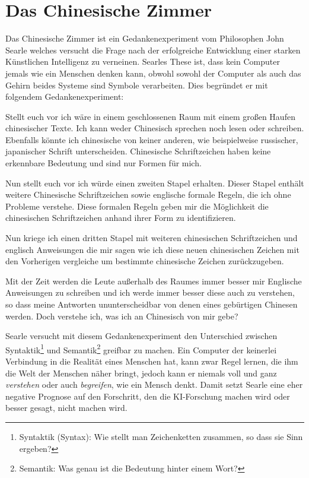 \documentclass[a4paper,12pt,german,ngerman]{report}
\begin{document}
    \section{Das Chinesische Zimmer}
    Das Chinesische Zimmer ist ein Gedankenexperiment vom Philosophen John Searle welches
    versucht die Frage nach der erfolgreiche Entwicklung einer starken Künstlichen Intelligenz zu verneinen.
    Searles These ist, dass kein Computer jemals wie ein Menschen denken kann,
    obwohl sowohl der Computer als auch das Gehirn beides Systeme sind Symbole verarbeiten.\cite{nimtz2013chinesische}
    Dies begründet er mit folgendem Gedankenexperiment:
    \begin{displayquote}
        Stellt euch vor ich wäre in einem geschlossenen Raum mit einem großen Haufen chinesischer Texte.
        Ich kann weder Chinesisch sprechen noch lesen oder schreiben.
        Ebenfalls könnte ich chinesische von keiner anderen, wie beispielweise russischer, japanischer Schrift unterscheiden.
        Chinesische Schriftzeichen haben keine erkennbare Bedeutung und sind nur Formen für mich.

        Nun stellt euch vor ich würde einen zweiten Stapel erhalten. Dieser Stapel enthält weitere
        Chinesische Schriftzeichen sowie englische formale Regeln, die ich ohne Probleme verstehe.
        Diese formalen Regeln geben mir die Möglichkeit die chinesischen Schriftzeichen
        anhand ihrer Form zu identifizieren.

        Nun kriege ich einen dritten Stapel mit weiteren chinesischen Schriftzeichen und englisch Anweisungen die mir sagen wie ich
        diese neuen chinesischen Zeichen mit den Vorherigen vergleiche um bestimmte chinesische Zeichen zurückzugeben.

        Mit der Zeit werden die Leute außerhalb des Raumes immer besser mir Englische Anweisungen zu schreiben und
        ich werde immer besser diese auch zu verstehen, so dass meine Antworten ununterscheidbar von denen eines
        gebürtigen Chinesen werden. Doch verstehe ich, was ich an Chinesisch von mir gebe?
        \cite[1]{searle1999chinese}
    \end{displayquote}
    Searle versucht mit diesem Gedankenexperiment den Unterschied zwischen
    Syntaktik\footnote{Syntaktik (Syntax): Wie stellt man Zeichenketten zusammen, so dass sie Sinn ergeben?}
    und Semantik\footnote{Semantik: Was genau ist die Bedeutung hinter einem Wort?}
    greifbar zu machen.
    Ein Computer der keinerlei Verbindung in die Realität eines Menschen hat, kann zwar Regel lernen, die ihm die
    Welt der Menschen näher bringt, jedoch kann er niemals voll und ganz \emph{verstehen} oder auch \emph{begreifen},
    wie ein Mensch denkt. Damit setzt Searle eine eher negative Prognose auf den Forschritt, den die KI-Forschung
    machen wird oder besser gesagt, nicht machen wird.
\end{document}
